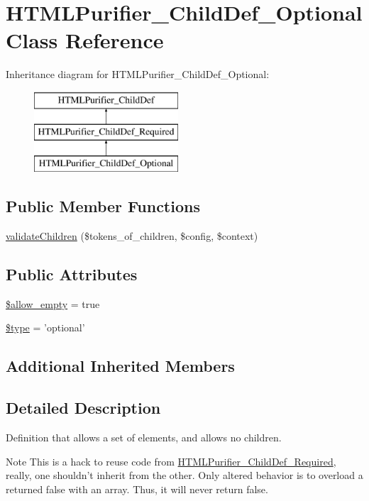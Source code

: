 \hypertarget{classHTMLPurifier__ChildDef__Optional}{\section{H\+T\+M\+L\+Purifier\+\_\+\+Child\+Def\+\_\+\+Optional Class Reference}
\label{classHTMLPurifier__ChildDef__Optional}
}
Inheritance diagram for H\+T\+M\+L\+Purifier\+\_\+\+Child\+Def\+\_\+\+Optional\+:\begin{figure}[H]
\begin{center}
\leavevmode
\includegraphics[height=3.000000cm]{classHTMLPurifier__ChildDef__Optional}
\end{center}
\end{figure}
\subsection*{Public Member Functions}
\begin{DoxyCompactItemize}
\item 
\hyperlink{classHTMLPurifier__ChildDef__Optional_ad71db7955182101ec01afbac783e27a9}{validate\+Children} (\$tokens\+\_\+of\+\_\+children, \$config, \$context)
\end{DoxyCompactItemize}
\subsection*{Public Attributes}
\begin{DoxyCompactItemize}
\item 
\hyperlink{classHTMLPurifier__ChildDef__Optional_a80d5714c4cd27511cfacafa39a96dfd9}{\$allow\+\_\+empty} = true
\item 
\hyperlink{classHTMLPurifier__ChildDef__Optional_ac12756a533fd1f420669156aeb6be162}{\$type} = 'optional'
\end{DoxyCompactItemize}
\subsection*{Additional Inherited Members}


\subsection{Detailed Description}
Definition that allows a set of elements, and allows no children. \begin{DoxyNote}{Note}
This is a hack to reuse code from \hyperlink{classHTMLPurifier__ChildDef__Required}{H\+T\+M\+L\+Purifier\+\_\+\+Child\+Def\+\_\+\+Required}, really, one shouldn't inherit from the other. Only altered behavior is to overload a returned false with an array. Thus, it will never return false. 
\end{DoxyNote}


